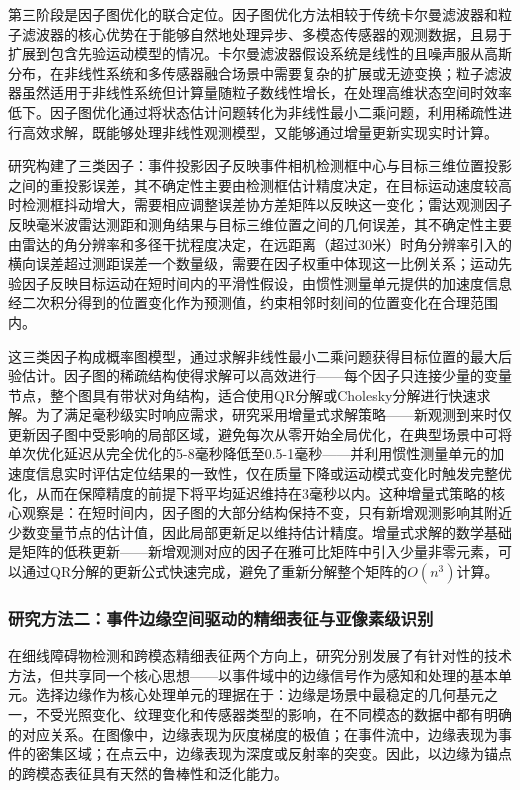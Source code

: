 第三阶段是因子图优化的联合定位。因子图优化方法相较于传统卡尔曼滤波器和粒子滤波器的核心优势在于能够自然地处理异步、多模态传感器的观测数据，且易于扩展到包含先验运动模型的情况。卡尔曼滤波器假设系统是线性的且噪声服从高斯分布，在非线性系统和多传感器融合场景中需要复杂的扩展或无迹变换；粒子滤波器虽然适用于非线性系统但计算量随粒子数线性增长，在处理高维状态空间时效率低下。因子图优化通过将状态估计问题转化为非线性最小二乘问题，利用稀疏性进行高效求解，既能够处理非线性观测模型，又能够通过增量更新实现实时计算。

研究构建了三类因子：事件投影因子反映事件相机检测框中心与目标三维位置投影之间的重投影误差，其不确定性主要由检测框估计精度决定，在目标运动速度较高时检测框抖动增大，需要相应调整误差协方差矩阵以反映这一变化；雷达观测因子反映毫米波雷达测距和测角结果与目标三维位置之间的几何误差，其不确定性主要由雷达的角分辨率和多径干扰程度决定，在远距离（超过30米）时角分辨率引入的横向误差超过测距误差一个数量级，需要在因子权重中体现这一比例关系；运动先验因子反映目标运动在短时间内的平滑性假设，由惯性测量单元提供的加速度信息经二次积分得到的位置变化作为预测值，约束相邻时刻间的位置变化在合理范围内。

这三类因子构成概率图模型，通过求解非线性最小二乘问题获得目标位置的最大后验估计。因子图的稀疏结构使得求解可以高效进行——每个因子只连接少量的变量节点，整个图具有带状对角结构，适合使用QR分解或Cholesky分解进行快速求解。为了满足毫秒级实时响应需求，研究采用增量式求解策略——新观测到来时仅更新因子图中受影响的局部区域，避免每次从零开始全局优化，在典型场景中可将单次优化延迟从完全优化的5-8毫秒降低至0.5-1毫秒——并利用惯性测量单元的加速度信息实时评估定位结果的一致性，仅在质量下降或运动模式变化时触发完整优化，从而在保障精度的前提下将平均延迟维持在3毫秒以内。这种增量式策略的核心观察是：在短时间内，因子图的大部分结构保持不变，只有新增观测影响其附近少数变量节点的估计值，因此局部更新足以维持估计精度。增量式求解的数学基础是矩阵的低秩更新——新增观测对应的因子在雅可比矩阵中引入少量非零元素，可以通过QR分解的更新公式快速完成，避免了重新分解整个矩阵的$O(n^3)$计算。

\subsubsection{研究方法二：事件边缘空间驱动的精细表征与亚像素级识别}

在细线障碍物检测和跨模态精细表征两个方向上，研究分别发展了有针对性的技术方法，但共享同一个核心思想——以事件域中的边缘信号作为感知和处理的基本单元。选择边缘作为核心处理单元的理据在于：边缘是场景中最稳定的几何基元之一，不受光照变化、纹理变化和传感器类型的影响，在不同模态的数据中都有明确的对应关系。在图像中，边缘表现为灰度梯度的极值；在事件流中，边缘表现为事件的密集区域；在点云中，边缘表现为深度或反射率的突变。因此，以边缘为锚点的跨模态表征具有天然的鲁棒性和泛化能力。

